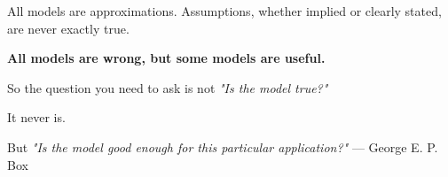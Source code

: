 {
\begin{frame}
    \begin{center}
        \large
        \color{white}
        All models are approximations. Assumptions, whether implied or clearly stated, are never exactly true.
        
        \vspace{1em}
        \textbf{All models are wrong, but some models are useful.} 
        
        \vspace{1em}
        So the question you need to ask is not \textit{"Is the model true?"} 
        
        \vspace{1em}   
        It never is.
        
        \vspace{1em}
        But \textit{"Is the model good enough for this particular application?"}
        \vfill
        \hfill --- George E. P. Box
    \end{center}
\end{frame}
}